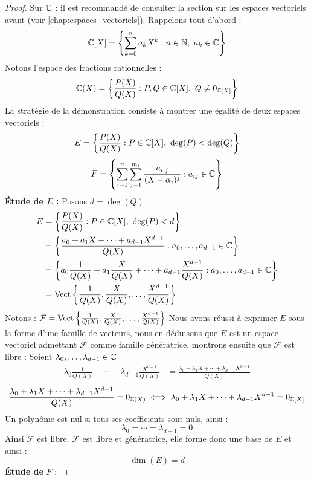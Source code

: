 \begin{proof}\cite{math-sup.fr_decomp}
    Sur $\mathbb{C}$ : il est recommandé de consulter la section sur les espaces vectoriels avant (voir \autoref{chap:espaces_vectoriels}).
    Rappelons tout d'abord :
    \[ \mathbb{C}[X] = \left\{ \sum_{k = 0}^{n} a_k X^k : n \in \mathbb{N},\ a_k \in \mathbb{C} \right\} \]
    Notons l'espace des fractions rationnelles :
    \[ \mathbb{C}(X) = \left\{ \frac{P(X)}{Q(X)} : P, Q \in \mathbb{C}[X],\ Q \neq 0_{\mathbb{C}[X]} \right\} \]
    La stratégie de la démonstration consiste à montrer une égalité de deux espaces vectoriels :
    \[ E = \left\{ \frac{P(X)}{Q(X)} : P \in \mathbb{C}[X],\ \deg(P) < \deg(Q) \right\} \]
    \[ F = \left\{ \sum_{i = 1}^{n} \sum_{j = 1}^{m_i} \frac{a_{i, j}}{(X - \alpha_i)^{j}} : a_{ij} \in \mathbb{C} \right\} \]
    \textbf{\'Etude de $E$ :} Posons $d = \deg(Q)$
    \begin{align*}
        E &= \left\{ \frac{P(X)}{Q(X)} : P \in \mathbb{C}[X],\ \deg(P) < d \right\} \\
          &= \left\{ \frac{a_0 + a_1X + \cdots + a_{d - 1} X^{d - 1}}{Q(X)} : a_0, \ldots, a_{d - 1} \in \mathbb{C} \right\} \\
          &= \left\{ a_0 \frac{1}{Q(X)} + a_1 \frac{X}{Q(X)} + \cdots + a_{d - 1} \frac{X^{d-1}}{Q(X)} : a_0, \ldots, a_{d - 1} \in \mathbb{C} \right\} \\
          &= \operatorname{Vect}\left\{ \frac{1}{Q(X)}, \frac{X}{Q(X)}, \ldots, \frac{X^{d-1}}{Q(X)} \right\}
    \end{align*}
    Notons : $\mathcal{F} = \operatorname{Vect}\left\{ \frac{1}{Q(X)}, \frac{X}{Q(X)}, \ldots, \frac{X^{d-1}}{Q(X)} \right\}$
    Nous avons réussi à exprimer $E$ sous la forme d'une famille de vecteurs, nous en déduisons que $E$ est un espace vectoriel admettant $\mathcal{F}$ comme famille génératrice, montrons ensuite que $\mathcal{F}$ est libre :
    Soient $ \lambda_0,\ldots,\lambda_{d-1} \in \mathbb{C}$
    \begin{align*}
        \lambda_0 \frac{1}{Q(X)} + \cdots + \lambda_{d - 1} \frac{X^{d-1}}{Q(X)} &= \frac{\lambda_0 + \lambda_{1} X + \cdots + \lambda_{d - 1} X^{d - 1}}{Q(X)}
    \end{align*}
    \[ \frac{\lambda_0 + \lambda_{1} X + \cdots + \lambda_{d - 1} X^{d - 1}}{Q(X)} = 0_{\mathbb{C}(X)} \iff \lambda_0 + \lambda_{1} X + \cdots + \lambda_{d - 1} X^{d - 1} = 0_{\mathbb{C}[X]} \]
    Un polynôme est nul si tous ses coefficients sont nuls, ainsi :
    \[ \lambda_0 = \cdots = \lambda_{d-1} = 0 \]
    Ainsi $\mathcal{F}$ est libre. $\mathcal{F}$ est libre et génératrice, elle forme donc une base de $E$ et ainsi : 
    \[ \dim(E) = d \]
    \textbf{\'Etude de} $F$ :

\end{proof}
